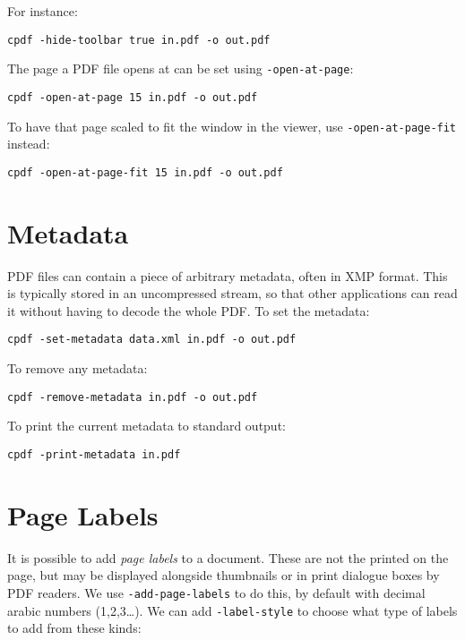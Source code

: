 \documentclass{book}
\begin{document}
  \noindent For instance:
  \begin{framed}
    \small\verb!cpdf -hide-toolbar true in.pdf -o out.pdf!
  \end{framed}

\noindent The page a PDF file opens at can be set using \texttt{-open-at-page}:
  \begin{framed}
    \small\verb!cpdf -open-at-page 15 in.pdf -o out.pdf!
  \end{framed}

\noindent To have that page scaled to fit the window in the viewer, use \texttt{-open-at-page-fit} instead:
  \begin{framed}
    \small\verb!cpdf -open-at-page-fit 15 in.pdf -o out.pdf!
  \end{framed}

  \section{Metadata}
  PDF files can contain a piece of arbitrary metadata, often in XMP format.
This is typically stored in an uncompressed stream, so that other applications
can read it without having to decode the whole PDF. To set the metadata:
  \begin{framed}
    \small\verb!cpdf -set-metadata data.xml in.pdf -o out.pdf!
  \end{framed}
  \noindent To remove any metadata:
  \begin{framed}
    \small\verb!cpdf -remove-metadata in.pdf -o out.pdf!
  \end{framed}
  \noindent To print the current metadata to standard output:
  \begin{framed}
    \small\verb!cpdf -print-metadata in.pdf!
  \end{framed}

\section{Page Labels}

It is possible to add \textit{page labels} to a document. These are not the printed on the page, but may be displayed alongside thumbnails or in print dialogue boxes by PDF readers. We use \texttt{-add-page-labels} to do this, by default with decimal arabic numbers (1,2,3\ldots). We can add \texttt{-label-style} to choose what type of labels to add from these kinds:
\end{document}
